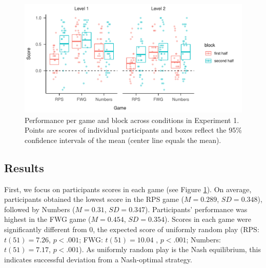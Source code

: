 \documentclass[smallextended]{svjour3}       %
\begin{document}
\begin{figure}

{\centering \includegraphics[width=\textwidth]{CBB_files/figure-latex/exp1-avg-scores-game-1} 

}

\caption{Performance per game and block across conditions in Experiment 1. Points are scores of individual participants and boxes reflect the 95\% confidence intervals of the mean (center line equals the mean).}\label{fig:exp1-avg-scores-game}
\end{figure}

\hypertarget{results}{%
\subsection{Results}\label{results}}

First, we focus on participants scores in each game (see Figure
\ref{fig:exp1-avg-scores-game}). On average, participants obtained the
lowest score in the RPS game (\(M = 0.289\), \(SD = 0.348\)), followed
by Numbers (\(M = 0.31\), \(SD = 0.347\)). Participants' performance was
highest in the FWG game (\(M = 0.454\), \(SD = 0.354\)). Scores in each
game were significantly different from 0, the expected score of
uniformly random play (RPS: \(t(51) = 7.26\), \(p < .001\); FWG:
\(t(51) = 10.04\) , \(p < .001\); Numbers: \(t(51) = 7.17\),
\(p < .001\)). As uniformly random play is the Nash equilibrium, this
indicates successful deviation from a Nash-optimal strategy.
\end{document}
